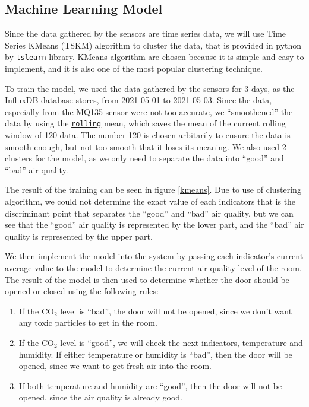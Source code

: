 \subsection{Machine Learning Model}
Since the data gathered by the sensors are time
series data, we will use Time Series KMeans (TSKM)
algorithm to cluster the data, that is provided in
python by
\href{https://tslearn.readthedocs.io/en/stable/}{\texttt{tslearn}} library.
KMeans algorithm are chosen because it is simple and
easy to implement, and it is also one of the most
popular clustering technique.

To train the model, we used the data gathered by the
sensors for 3 days, as the InfluxDB database stores,
from 2021-05-01 to 2021-05-03. Since the data,
especially from the MQ135 sensor were not too
accurate, we ``smoothened'' the data by using the
\href{https://pandas.pydata.org/docs/reference/api/pandas.DataFrame.rolling.html}{\texttt{rolling}} mean, which saves
the mean of the current rolling window of 120 data. The number
120 is chosen arbitarily to ensure the data is smooth enough,
but not too smooth that it loses its meaning. We also used 2
clusters for the model, as we only need to separate the data
into ``good'' and ``bad'' air quality.

The result of the training can be seen in
figure \ref{kmeans}. Due to use of clustering algorithm, we could not
determine the exact value of each indicators that is the
discriminant point that separates the ``good'' and ``bad''
air quality, but we can see that the ``good'' air quality is
represented by the lower part, and the ``bad'' air quality is
represented by the upper part.

We then implement the model into the system by passing each
indicator's current average value to the model to determine
the current air quality level of the room. The result of the
model is then used to determine whether the door should be
opened or closed using the following rules:
\begin{enumerate}
    \item If the CO$_2$ level is ``bad'', the door will not be
          opened, since we don't want any toxic particles to
          get in the room.
    \item If the CO$_2$ level is ``good'', we will check the
          next indicators, temperature and humidity. If
          either temperature or humidity is ``bad'', then the
          door will be opened, since we want to get fresh
          air into the room.
    \item If both temperature and humidity are ``good'',
          then the door will not be opened, since the air
          quality is already good.
\end{enumerate}

